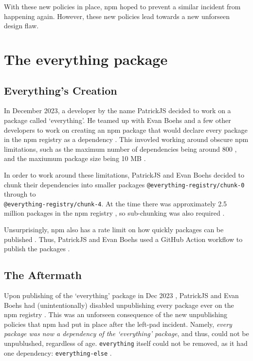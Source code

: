 \documentclass[acmsmall]{acmart}
\begin{document}
With these new policies in place, npm hoped to prevent a similar incident from
happening again. However, these new policies lead towards a new unforseen design
flaw.

\section{The everything package}
\subsection{Everything's Creation}
In December 2023, a developer by the name PatrickJS decided to work on a package
called `everything'. He teamed up with Evan Boehs and a few other developers to
work on creating an npm package that would declare every package in the npm
registry as a dependency \cite{uncenter-blog-everything}. This invovled working
around obscure npm limitations, such as the maximum number of dependencies being
around 800 \cite{uncenter-blog-everything, youtube-everything}, and the maxiumum
package size being 10 MB \cite{uncenter-blog-everything, youtube-everything}.

In order to work around these limitations, PatrickJS and Evan Boehs decided to
chunk their dependencies into smaller packages
\lstinline|@everything-registry/chunk-0| through to \\
\lstinline|@everything-registry/chunk-4|. At the time there was approximately
2.5 million packages in the npm registry \cite{youtube-everything}, so
sub-chunking was also required \cite{youtube-everything}.

Unsurprisingly, npm also has a rate limit on how quickly packages can be
published \cite{npm-ratelimiting,github-npm-ratelimiting}. Thus, PatrickJS and
Evan Boehs used a GitHub Action workflow to publish the packages
\cite{youtube-everything,uncenter-blog-everything}.

\subsection{The Aftermath}
Upon publishing of the `everything' package in Dec 2023 \cite{npm-everything},
PatrickJS and Evan Boehs had (unintentionally) disabled unpublishing every
package ever on the npm registry \cite{youtube-everything}. This was an
unforseen consequence of the new unpublishing policies that npm had put in place
after the left-pad incident. Namely, \textit{every package was now a dependency
  of the `everything' package}, and thus, could not be unpublushed, regardless of
age. \lstinline|everything| itself could not be removed, as it had one
dependency: \lstinline|everything-else| \cite{npm-everything-else}.
\end{document}
